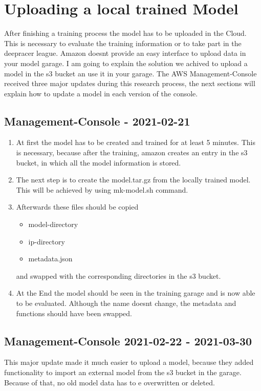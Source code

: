 \section{Uploading a local trained Model}
After finishing a training process the model has to be uploaded in the Cloud. This is necessary to evaluate the training information or to take part in the deepracer league. Amazon doesnt provide an easy interface to upload data in your model garage. I am going to explain the solution we achived to upload a model in the s3 bucket an use it in your garage. The AWS Management-Console received three major updates during this research process, the next sections will explain how to update a model in each version of the console.

\subsection{Management-Console - 2021-02-21}

\begin{enumerate}
    \item At first the model has to be created and trained for at least 5 minutes. This is necessary, because after the training, amazon creates an entry in the s3 bucket, in which all the model information is stored.
    \item The next step is to create the model.tar.gz from the locally trained model. This will be achieved by using mk-model.sh command.
    \item Afterwards these files should be copied 
    \begin{itemize}
        \item model-directory
        \item ip-directory
        \item metadata.json
    \end{itemize}
    and swapped with the corresponding directories in the s3 bucket.
    \item At the End the model should be seen in the training garage and is now able to be evaluated. Although the name doesnt change, the metadata and functions should have been swapped.
\end{enumerate}


\subsection{Management-Console 2021-02-22 - 2021-03-30}
This major update made it much easier to upload a model, because they added functionality to import an external model from the s3 bucket in the garage. Because of that, no old model data has to e overwritten or deleted.

